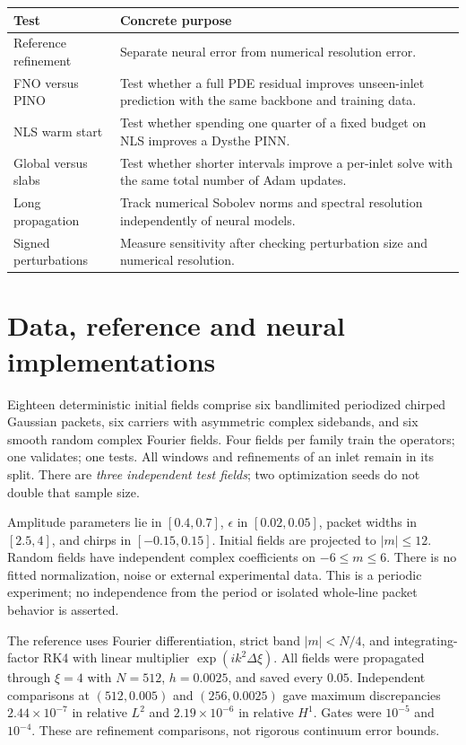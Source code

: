 \documentclass[11pt]{article}
\begin{document}
\begin{center}\small
\begin{tabular}{p{}p{}}\toprule
Test & Concrete purpose\\\midrule
Reference refinement & Separate neural error from numerical resolution error.\\
FNO versus PINO & Test whether a full PDE residual improves unseen-inlet prediction with the same backbone and training data.\\
NLS warm start & Test whether spending one quarter of a fixed budget on NLS improves a Dysthe PINN.\\
Global versus slabs & Test whether shorter intervals improve a per-inlet solve with the same total number of Adam updates.\\
Long propagation & Track numerical Sobolev norms and spectral resolution independently of neural models.\\
Signed perturbations & Measure sensitivity after checking perturbation size and numerical resolution.\\\bottomrule
\end{tabular}
\end{center}

\newpage
\section{Data, reference and neural implementations}
Eighteen deterministic initial fields comprise six bandlimited periodized chirped Gaussian packets, six carriers with asymmetric complex sidebands, and six smooth random complex Fourier fields. Four fields per family train the operators; one validates; one tests. All windows and refinements of an inlet remain in its split. There are \emph{three independent test fields}; two optimization seeds do not double that sample size.

Amplitude parameters lie in $[0.4,0.7]$, $\epsilon$ in $[0.02,0.05]$, packet widths in $[2.5,4]$, and chirps in $[-0.15,0.15]$. Initial fields are projected to $|m|\leq12$. Random fields have independent complex coefficients on $-6\leq m\leq6$. There is no fitted normalization, noise or external experimental data. This is a periodic experiment; no independence from the period or isolated whole-line packet behavior is asserted.

The reference uses Fourier differentiation, strict band $|m|<N/4$, and integrating-factor RK4 with linear multiplier $\exp(ik^2\Delta\xi)$. All fields were propagated through $\xi=4$ with $N=512$, $h=0.0025$, and saved every $0.05$. Independent comparisons at $(512,0.005)$ and $(256,0.0025)$ gave maximum discrepancies $2.44\times10^{-7}$ in relative $L^2$ and $2.19\times10^{-6}$ in relative $H^1$. Gates were $10^{-5}$ and $10^{-4}$. These are refinement comparisons, not rigorous continuum error bounds.
\end{document}
